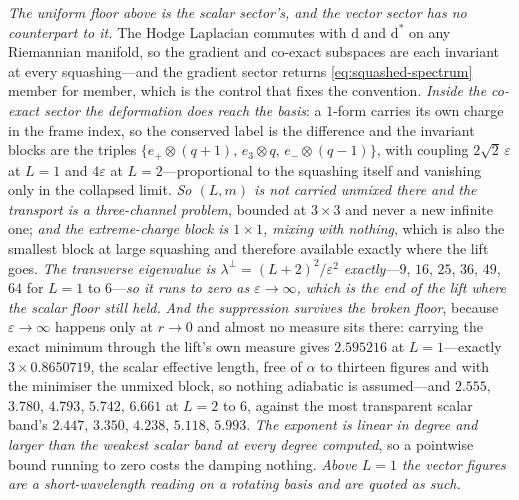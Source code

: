 \documentclass[11pt,a4paper]{article}
\theoremstyle{plain}
\theoremstyle{definition}
\theoremstyle{remark}
\newcommand{\dd}{\mathrm{d}}   %
\begin{document}
\emph{The uniform floor above is the scalar sector's, and the vector sector has no counterpart to it.} The Hodge Laplacian commutes with $\dd$ and $\dd^{*}$ on any Riemannian manifold, so the gradient and co-exact subspaces are each invariant at every squashing---and the gradient sector returns \eqref{eq:squashed-spectrum} member for member, which is the control that fixes the convention. \emph{Inside the co-exact sector the deformation does reach the basis}: a $1$-form carries its own charge in the frame index, so the conserved label is the difference and the invariant blocks are the triples $\{e_{+}\!\otimes\!(q{+}1),\,e_{3}\!\otimes\!q,\,e_{-}\!\otimes\!(q{-}1)\}$, with coupling $2\sqrt2\,\varepsilon$ at $L=1$ and $4\varepsilon$ at $L=2$---proportional to the squashing itself and vanishing only in the collapsed limit. \emph{So $(L,m)$ is not carried unmixed there and the transport is a three-channel problem}, bounded at $3\times3$ and never a new infinite one; \emph{and the extreme-charge block is $1\times1$, mixing with nothing}, which is also the smallest block at large squashing and therefore available exactly where the lift goes. \emph{The transverse eigenvalue is $\lambda^{\perp}=(L+2)^2/\varepsilon^2$ exactly}---$9$, $16$, $25$, $36$, $49$, $64$ for $L=1$ to $6$---\emph{so it runs to zero as $\varepsilon\to\infty$, which is the end of the lift where the scalar floor still held.} \emph{And the suppression survives the broken floor}, because $\varepsilon\to\infty$ happens only at $r\to0$ and almost no measure sits there: carrying the exact minimum through the lift's own measure gives $2.595216$ at $L=1$---exactly $3\times0.8650719$, the scalar effective length, free of $\alpha$ to thirteen figures and with the minimiser the unmixed block, so nothing adiabatic is assumed---and $2.555$, $3.780$, $4.793$, $5.742$, $6.661$ at $L=2$ to $6$, against the most transparent scalar band's $2.447$, $3.350$, $4.238$, $5.118$, $5.993$. \emph{The exponent is linear in degree and larger than the weakest scalar band at every degree computed}, so a pointwise bound running to zero costs the damping nothing. \emph{Above $L=1$ the vector figures are a short-wavelength reading on a rotating basis and are quoted as such.}
\end{document}
